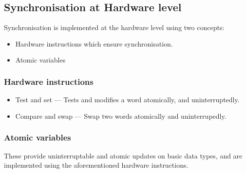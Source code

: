 \subsection{Synchronisation at Hardware level}

Synchronisation is implemented at the hardware level using two concepts:
\begin{itemize}
    \item Hardware instructions which ensure synchronisation.
    \item Atomic variables
\end{itemize}

\subsubsection{Hardware instructions}

\begin{itemize}
    \item Test and set --- Tests and modifies a word atomically, and uninterruptedly.
    \item Compare and swap --- Swap two words atomically and uninterrupedly.
\end{itemize}

\subsubsection{Atomic variables}

These provide uninterruptable and atomic updates on basic data types, and are implemented using the
aforementioned hardware instructions.